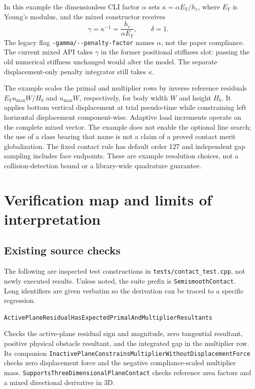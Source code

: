 \documentclass[preprint,11pt]{elsarticle}
\numberwithin{equation}{section}
\newcommand{\code}[1]{\texttt{\nolinkurl{#1}}}
\newcommand{\testname}[1]{\par\smallskip\noindent\code{#1}\par\nobreak}
\begin{document}
In this example the dimensionless CLI factor $\alpha$ sets
$\kappa=\alpha E_Y/h_c$, where $E_Y$ is Young's modulus, and the mixed
constructor receives
\begin{equation}
 \gamma=\kappa^{-1}=\frac{h_c}{\alpha E_Y},\qquad \delta=1.
 \label{eq:examplegamma}
\end{equation}
The legacy flag \code{-gamma/--penalty-factor} names $\alpha$, not
the paper compliance. The current mixed API takes $\gamma$ in the
former positional stiffness slot: passing the old numerical stiffness
unchanged would alter the model. The separate displacement-only penalty
integrator still takes $\kappa$.

The example scales the primal and multiplier rows by inverse reference
residuals $E_Y u_{\max}W/H_b$ and $u_{\max}W$, respectively, for body
width $W$ and height $H_b$. It applies bottom vertical displacement at
trial pseudo-time while constraining left horizontal displacement
component-wise. Adaptive load increments operate on the complete mixed
vector. The example does not enable the optional line search; the use
of a class bearing that name is not a claim of a proved contact merit
globalization. The fixed contact rule has default order 127 and independent
gap sampling includes face endpoints. These are example resolution choices,
not a collision-detection bound or a library-wide quadrature guarantee.

\section{Verification map and limits of interpretation}
\label{sec:verification}

\subsection{Existing source checks}
The following are inspected test constructions in
\code{tests/contact_test.cpp}, not newly executed results. Unless noted,
the suite prefix is \code{SemismoothContact}. Long identifiers are given
verbatim so the derivation can be traced to a specific regression.

\testname{ActivePlaneResidualHasExpectedPrimalAndMultiplierResultants}
Checks the active-plane residual sign and magnitude, zero tangential
resultant, positive physical obstacle resultant, and the integrated gap
in the multiplier row. Its companion
\code{InactivePlaneConstrainsMultiplierWithoutDisplacementForce}
checks zero displacement force and the negative compliance-scaled
multiplier mass. \code{SupportsThreeDimensionalPlaneContact} checks
reference area factors and a mixed directional derivative in 3D.
\end{document}
